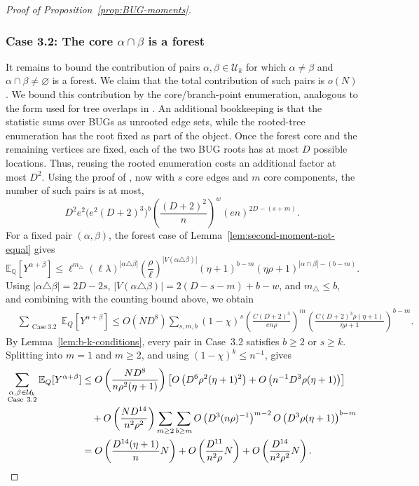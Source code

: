 \documentclass[11pt, letterpaper]{article}
\numberwithin{equation}{section}
\newcommand{\E}{\mathbb{E}}
\newcommand{\QQ}{\mathbb{Q}}
\newcommand{\cU}{\mathcal{U}}
\begin{document}
\begin{proof}[Proof of Proposition~\ref{prop:BUG-moments}]
\subsubsection*{Case 3.2: The core $\alpha \cap \beta$ is a forest}
It remains to bound the contribution of pairs $\alpha,\beta \in \cU_k$ for which $\alpha \ne \beta $ and $\alpha \cap \beta\ne \varnothing$ is a forest. We claim that the total contribution of such pairs is $o(N)$. We bound this contribution by the core/branch-point enumeration, analogous to the form used for tree overlaps in \cite[Proof of Theorem~2.2 (b), Case 3]{sohn2025sharp}. An additional bookkeeping is that the statistic sums over BUGs as unrooted edge sets, while the rooted-tree enumeration has the root fixed as part of the object. Once the forest core and the remaining vertices are fixed, each of the two BUG roots has at most $D$ possible locations. Thus, reusing the rooted enumeration costs an additional factor at most $D^2$. Using the proof of , now with $s$ core edges and $m$ core components, the number of such pairs is at most,
\[
        D^2 e^2
        \bigl(e^2(D+2)^3\bigr)^b
        \left(\frac{(D+2)^2}{n}\right)^w
        (en)^{2D-(s+m)}.
\]
For a fixed pair $(\alpha,\beta)$, the forest case of Lemma~\ref{lem:second-moment-not-equal} gives
$$\E_\QQ \left[Y^{\alpha+\beta}\right] \le \ell^{m_\triangle}(\ell\lambda)^{|\alpha \triangle \beta|}
 \left(\frac{\rho}{\ell}\right)^{|V(\alpha \triangle \beta)|}
 ( \eta + 1)^{b-m}
 (\eta \rho + 1)^{|\alpha \cap \beta| - (b - m)}.$$
Using \( |\alpha\triangle\beta|=2D-2s\), 
\(|V(\alpha\triangle\beta)|=2(D-s-m)+b-w\), and $m_\triangle\le b$, and combining with the counting bound above, we obtain
\begin{align*}
&\sum_{\substack{\mathrm{Case\ 3.2}}}
\mathbb E_Q[Y^{\alpha+\beta}]\le
O(ND^8)
\sum_{s,m,b}
(1-\chi)^s
\left(\frac{C(D+2)^3}{en\rho}\right)^m
\left(\frac{C(D+2)^3\rho(\eta+1)}{\eta\rho+1}\right)^{b-m}.
\end{align*}
By Lemma~\ref{lem:b-k-conditions}, every pair in Case~3.2 satisfies \(b\ge2\) or \(s\ge k\). Splitting into \(m=1\) and \(m\ge2\), and using \((1-\chi)^k\le n^{-1}\), gives
\begin{align}
\notag\sum_{\substack{\alpha,\beta \in \cU_k\\ \mathrm{Case\ 3.2}}}
\mathbb E_Q[Y^{\alpha+\beta}]&\le
O\left(\frac{ND^8}{n\rho^2(\eta+1)}\right)
\left[
O\left(D^6\rho^2(\eta+1)^2\right)
+
O\left(n^{-1}D^3\rho(\eta+1)\right)
\right]\\
\notag&\quad+
O\left(\frac{ND^{14}}{n^2\rho^2}\right)
\sum_{m\ge2}\sum_{b\ge m}
O\left(D^3(n\rho)^{-1}\right)^{m-2}
O\left(D^3\rho(\eta+1)\right)^{b-m}\\
&=
O\left(\frac{D^{14}(\eta+1)}{n}N\right)
+
O\left(\frac{D^{11}}{n^2\rho}N\right)
+
O\left(\frac{D^{14}}{n^2\rho^2}N\right).\label{eq.psm_ub_case3.2}
\end{align}


\end{proof}
\end{document}
